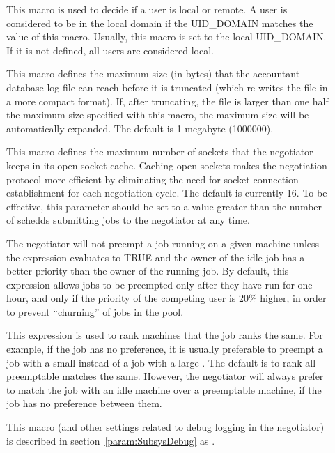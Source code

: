 \begin{description}
\item[] \label{param:AccountantLocalDomain} 
  This macro is used to decide if a user is local or remote. A user
  is considered to be in the local domain if the UID\_DOMAIN matches
  the value of this macro. Usually, this macro is set
  to the local UID\_DOMAIN. If it is not defined, all users are considered
  local.

\item[] 
  \label{param:MaxAccountantDatabaseSize}
  This macro defines the maximum size (in bytes) that the accountant
  database log file can reach before it is truncated (which re-writes
  the file in a more compact format).
  If, after truncating, the file is larger than one half the maximum
  size specified with this macro, the maximum size will be
  automatically expanded.
  The default is 1 megabyte (1000000).

\item[]
  \label{param:NegotiatorSocketCacheSize} This macro defines the
  maximum number of sockets that the negotiator keeps in its
  open socket cache.  Caching open sockets makes the negotiation
  protocol more efficient by eliminating the need for socket
  connection establishment for each negotiation cycle.  The default is
  currently 16.  To be effective, this parameter should be set to a
  value greater than the number of schedds submitting jobs to the
  negotiator at any time.

\item[]
  \label{param:PreemptionRequirements} The negotiator will not preempt
  a job running on a given machine unless the
   expression evaluates to TRUE and the
  owner of the idle job has a better priority than the owner of the
  running job.  By default, this expression allows jobs to be
  preempted only after they have run for one hour, and only if the
  priority of the competing user is 20\% higher, in order to prevent
  ``churning'' of jobs in the pool.

\item[] \label{param:PreemptionRank} This
  expression is used to rank machines that the job ranks the same.
  For example, if the job has no preference, it is usually preferable
  to preempt a job with a small  instead of a job with a
  large .  The default is to rank all preemptable matches the
  same.  However, the negotiator will always prefer to match the job
  with an idle machine over a preemptable machine, if the job has no
  preference between them.

\item[] \label{param:NegotiatorDebug} This macro
  (and other settings related to debug logging in the negotiator) is
  described in section~\ref{param:SubsysDebug} as .

\end{description}

